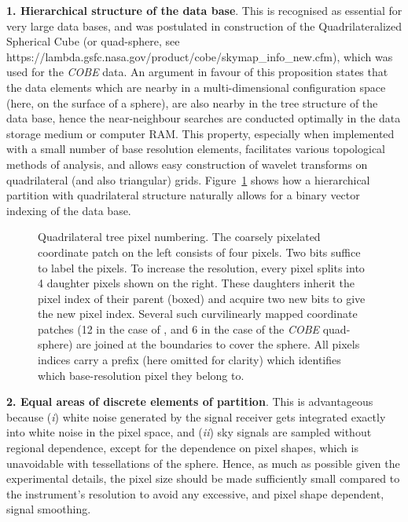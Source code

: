 \documentclass[12pt,twoside]{article}
\begin{document}
\textbf{1. Hierarchical structure of the data base}. This is recognised as 
essential for very large data bases, and was  postulated 
in construction
of the Quadrilateralized Spherical Cube 
(or quad-sphere, see 
{https://lambda.gsfc.nasa.gov/product/cobe/skymap_info_new.cfm}),
which was used for the
{\it COBE} data. An  argument in favour of this 
proposition
states that the data elements  
which are nearby in a multi-dimensional configuration space 
(here, on the surface of 
a sphere), are also nearby in the tree structure of the data base, hence
the near-neighbour searches are conducted optimally in the data storage medium
or computer RAM.
This property, especially when implemented with a small number of base
resolution elements, 
facilitates various topological methods of analysis, 
and allows easy construction
of wavelet transforms on quadrilateral (and also triangular) grids. 
Figure~\ref{fig:quadtree} %
shows how a hierarchical partition with 
quadrilateral structure naturally allows for a binary vector indexing
of the data base.

\begin{figure}[!ht]
\caption[Quadrilateral tree pixel numbering]%
{\label{fig:quadtree}%
Quadrilateral tree pixel numbering. 
The coarsely pixelated coordinate patch on
the left consists 
of four pixels. Two bits suffice to label the pixels. 
To increase the resolution, every 
pixel splits into 
4 daughter pixels shown on the right. These daughters inherit the pixel
index of their 
parent (boxed) and acquire 
two new bits to give the new pixel index. 
Several such curvilinearly mapped coordinate patches 
(12 in the case of \healpixns, and 6 in the case of the {\it COBE} quad-sphere) 
are joined at the boundaries to cover
the sphere. All pixels indices carry a prefix (here omitted for clarity) 
which identifies which base-resolution pixel they belong to.}
\end{figure}

\textbf{2. Equal areas of discrete elements of partition}. This is advantageous 
because ({\it i})
white noise generated by the  signal receiver 
gets integrated exactly into
white noise in the pixel space, and 
({\it ii}) sky signals are sampled without regional dependence, except for 
the dependence on pixel shapes, which is unavoidable with tessellations of the 
sphere. 
Hence, as much as possible given the experimental details, the pixel
size should be made sufficiently small compared to the 
instrument's resolution to avoid any excessive, and pixel shape dependent, 
signal smoothing.
\end{document}
